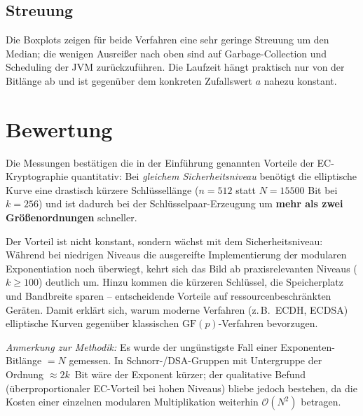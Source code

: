 \documentclass[
    fontsize=12pt,          %
    paper=a4,               %
    numbers=noenddot,       %
    listof=totoc,           %
    listof=entryprefix,     %
    listof=nochaptergap,    %
    bibliography=totoc,     %
    parskip=half,           %
    openany                 %
]{scrbook}
\begin{document}
\subsection*{Streuung}

Die Boxplots zeigen für beide Verfahren eine sehr geringe Streuung um den Median; die wenigen Ausreißer
nach oben sind auf Garbage-Collection und Scheduling der JVM zurückzuführen. Die Laufzeit hängt
praktisch nur von der Bitlänge ab und ist gegenüber dem konkreten Zufallswert $a$ nahezu konstant.


\section*{Bewertung}

Die Messungen bestätigen die in der Einführung genannten Vorteile der EC-Kryptographie quantitativ:
Bei \emph{gleichem Sicherheitsniveau} benötigt die elliptische Kurve eine drastisch kürzere
Schlüssellänge ($n=512$ statt $N=15500$ Bit bei $k=256$) und ist dadurch bei der
Schlüsselpaar-Erzeugung um \textbf{mehr als zwei Größenordnungen} schneller.

Der Vorteil ist nicht konstant, sondern wächst mit dem Sicherheitsniveau: Während bei niedrigen
Niveaus die ausgereifte Implementierung der modularen Exponentiation noch überwiegt, kehrt sich das
Bild ab praxisrelevanten Niveaus ($k \ge 100$) deutlich um. Hinzu kommen die kürzeren Schlüssel,
die Speicherplatz und Bandbreite sparen -- entscheidende Vorteile auf ressourcenbeschränkten Geräten.
Damit erklärt sich, warum moderne Verfahren (z.\,B.\ ECDH, ECDSA) elliptische Kurven gegenüber
klassischen $\mathrm{GF}(p)$-Verfahren bevorzugen.

\emph{Anmerkung zur Methodik:} Es wurde der ungünstigste Fall einer Exponenten-Bitlänge $=N$ gemessen.
In Schnorr-/DSA-Gruppen mit Untergruppe der Ordnung $\approx 2k$~Bit wäre der Exponent kürzer; der
qualitative Befund (überproportionaler EC-Vorteil bei hohen Niveaus) bliebe jedoch bestehen, da die
Kosten einer einzelnen modularen Multiplikation weiterhin $\mathcal{O}(N^2)$ betragen.

\end{document}

